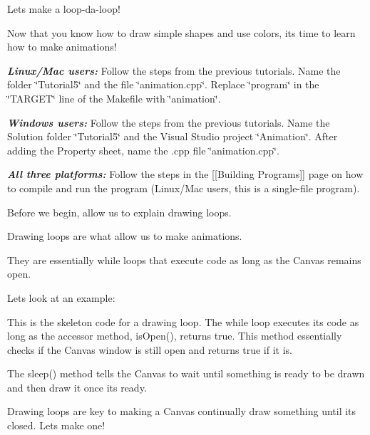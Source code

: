 Let\textquotesingle{}s make a loop-\/da-\/loop!

Now that you know how to draw simple shapes and use colors, it\textquotesingle{}s time to learn how to make animations!

{\itshape {\bfseries{Linux/\+Mac users\+:}}} Follow the steps from the previous tutorials. Name the folder \char`\"{}\+Tutorial5\char`\"{} and the file \char`\"{}animation.\+cpp\char`\"{}. Replace \char`\"{}program\char`\"{} in the \char`\"{}\+T\+A\+R\+G\+E\+T\char`\"{} line of the Makefile with \char`\"{}animation\char`\"{}.

{\itshape {\bfseries{Windows users\+:}}} Follow the steps from the previous tutorials. Name the Solution folder \char`\"{}\+Tutorial5\char`\"{} and the Visual Studio project \char`\"{}\+Animation\char`\"{}. After adding the Property sheet, name the .cpp file \char`\"{}animation.\+cpp\char`\"{}.

{\itshape {\bfseries{All three platforms\+:}}} Follow the steps in the \mbox{[}\mbox{[}Building Programs\mbox{]}\mbox{]} page on how to compile and run the program (Linux/\+Mac users, this is a single-\/file program).

Before we begin, allow us to explain drawing loops.

Drawing loops are what allow us to make animations.

They are essentially while loops that execute code as long as the Canvas remains open.

Let\textquotesingle{}s look at an example\+:


\begin{DoxyCode}{0}
\DoxyCodeLine{  \textcolor{comment}{//Code to execute as long as the Canvas is open...}}
\DoxyCodeLine{\}}
\end{DoxyCode}


This is the skeleton code for a drawing loop. The while loop executes its code as long as the accessor method, {\ttfamily is\+Open()}, returns {\ttfamily true}. This method essentially checks if the Canvas window is still open and returns {\ttfamily true} if it is.

The {\ttfamily sleep()} method tells the Canvas to wait until something is ready to be drawn and then draw it once its ready.

Drawing loops are key to making a Canvas continually draw something until its closed. Let\textquotesingle{}s make one!

